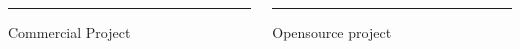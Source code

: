 \documentclass{beamer}
\begin{document}
  \begin{frame}
    \begin{columns}
      \begin{column}{.48\textwidth}\color{red}\rule{\linewidth}{4pt}
        Commercial Project
      \hfill%
      \end{column}%
      \begin{column}{.48\textwidth}\color{blue}\rule{\linewidth}{4pt}
        Opensource project
      \end{column}
    \end{columns}
  \end{frame}
\end{document}
